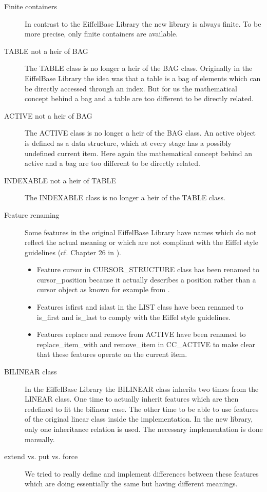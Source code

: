 \begin{description}
	\item [Finite containers] In contrast to the EiffelBase Library the new library is always finite. To be more precise, only finite containers are available.
	\item [TABLE not a heir of BAG] The TABLE class is no longer a heir of the BAG class. Originally in the EiffelBase Library the idea was that a table is a bag of elements which can be directly accessed through an index. But for us the mathematical concept behind a bag and a table are too different to be directly related.
	\item [ACTIVE not a heir of BAG] The ACTIVE class is no longer a heir of the BAG class. An active object is defined as a data structure, which at every stage has a possibly undefined current item. Here again the mathematical concept behind an active and a bag are too different to be directly related.
	\item [INDEXABLE not a heir of TABLE] The INDEXABLE class is no longer a heir of the TABLE class.
	\item [Feature renaming] Some features in the original EiffelBase Library have names which do not reflect the actual meaning or which are not compliant with the Eiffel style guidelines (cf. Chapter 26 in \cite{Meyer97Object}).
	\begin{itemize}
		\item Feature cursor in CURSOR\_STRUCTURE class has been renamed to cursor\_position because it actually describes a position rather than a cursor object as known for example from \cite{Bezault07Gobo}.
		\item Features isfirst and islast in the LIST class have been renamed to is\_first and is\_last to comply with the Eiffel style guidelines.
		\item Features replace and remove from ACTIVE have been renamed to replace\_item\_with and remove\_item in CC\_ACTIVE to make clear that these features operate on the current item.
	\end{itemize}
	\item [BILINEAR class] In the EiffelBase Library the BILINEAR class inherits two times from the LINEAR class. One time to actually inherit features which are then redefined to fit the bilinear case. The other time to be able to use features of the original linear class inside the implementation. In the new library, only one inheritance relation is used. The necessary implementation is done manually.
	\item [extend vs. put vs. force] We tried to really define and implement differences between these features which are doing essentially the same but having different meanings.

\end{description}
